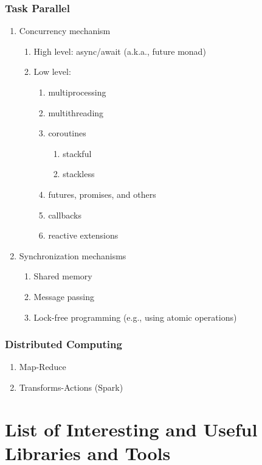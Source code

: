 \documentclass{article}
\begin{document}
\subsubsection{Task Parallel}
\begin{enumerate}
    \item Concurrency mechanism
    \begin{enumerate}
        \item High level: async/await (a.k.a., future monad)
        \item Low level:
        \begin{enumerate}
            \item multiprocessing
            \item multithreading
            \item coroutines
            \begin{enumerate}
                \item stackful
                \item stackless
            \end{enumerate}
            \item futures, promises, and others
            \item callbacks
            \item reactive extensions
        \end{enumerate}
    \end{enumerate}
    \item Synchronization mechanisms
    \begin{enumerate}
        \item Shared memory
        \item Message passing
        \item Lock-free programming (e.g., using atomic operations)
    \end{enumerate}
\end{enumerate}
\subsubsection{Distributed Computing}
\begin{enumerate}
    \item Map-Reduce
    \item Transforms-Actions (Spark)
\end{enumerate}

\section{List of Interesting and Useful Libraries and Tools}
\end{document}
